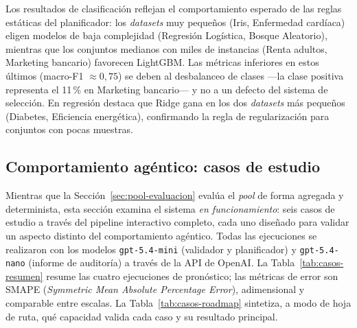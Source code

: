 Los resultados de clasificación reflejan el comportamiento esperado de las reglas
estáticas del planificador: los \textit{datasets} muy pequeños (Iris, Enfermedad
cardíaca) eligen modelos de baja complejidad (Regresión Logística, Bosque Aleatorio),
mientras que los conjuntos medianos con miles de instancias (Renta adultos, Marketing
bancario) favorecen LightGBM.
Las métricas inferiores en estos últimos (macro-F1 $\approx 0{,}75$) se deben al
desbalanceo de clases —la clase positiva representa el 11\,\% en Marketing bancario—
y no a un defecto del sistema de selección.
En regresión destaca que Ridge gana en los dos \textit{datasets} más pequeños
(Diabetes, Eficiencia energética), confirmando la regla de regularización para
conjuntos con pocas muestras.

\subsection{Comportamiento agéntico: casos de estudio}
\label{sec:casos-estudio}

Mientras que la Sección~\ref{sec:pool-evaluacion} evalúa el \textit{pool} de forma
agregada y determinista, esta sección examina el sistema \emph{en funcionamiento}:
seis casos de estudio a través del pipeline interactivo completo, cada uno diseñado para
validar un aspecto distinto del comportamiento agéntico. Todas las ejecuciones se
realizaron con los modelos \texttt{gpt-5.4-mini} (validador y planificador) y
\texttt{gpt-5.4-nano} (informe de auditoría) a través de la API de OpenAI.
La Tabla~\ref{tab:casos-resumen} resume las cuatro ejecuciones de pronóstico; las
métricas de error son SMAPE (\textit{Symmetric Mean Absolute Percentage Error}),
adimensional y comparable entre escalas. La Tabla~\ref{tab:casos-roadmap} sintetiza, a modo
de hoja de ruta, qué capacidad valida cada caso y su resultado principal.

